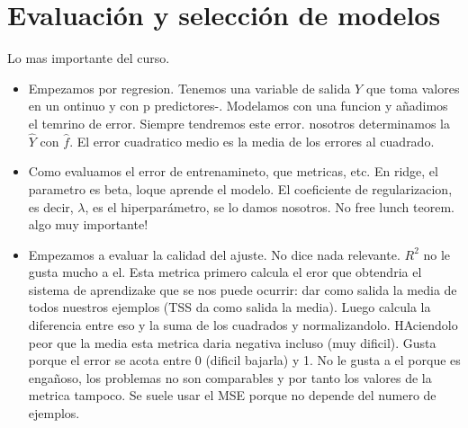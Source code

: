 \chapter{Evaluación y selección de modelos}\label{Chapter6} 

Lo mas importante del curso. 

\begin{itemize}
\item Empezamos por regresion. Tenemos una variable de salida $Y$ que toma valores en un ontinuo y con p predictores-. Modelamos con una funcion y añadimos el temrino de error. Siempre tendremos este error. nosotros determinamos la $\hat{Y}$ con $\hat{f}$. El error cuadratico medio es la media de los errores al cuadrado.
\item Como evaluamos el error de entrenamineto, que metricas, etc. En ridge, el parametro es beta, loque aprende el modelo. El coeficiente de regularizacion, es decir, $\lambda$, es el hiperparámetro, se lo damos nosotros. No free lunch teorem. algo muy importante!
\item Empezamos a evaluar la calidad del ajuste. No dice nada relevante. $R^2$ no le gusta mucho a el. Esta metrica primero calcula el eror que obtendria el sistema de aprendizake que se nos puede ocurrir: dar como salida la media de todos nuestros ejemplos (TSS da como salida la media). Luego calcula la diferencia entre eso y la suma de los cuadrados y normalizandolo. HAciendolo peor que la media esta metrica daria negativa incluso (muy dificil). Gusta porque el error se acota entre 0 (dificil bajarla) y 1. No le gusta a el porque es engañoso, los problemas no son comparables y por tanto los valores de la metrica tampoco. Se suele usar el MSE porque no depende del numero de ejemplos. 


\end{itemize}
